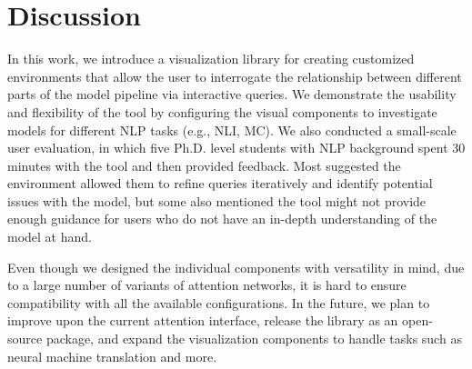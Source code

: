 \section{Discussion}
In this work, we introduce a visualization library for creating customized environments that allow the user to interrogate the relationship between different parts of the model pipeline via interactive queries.
%
We demonstrate the usability and flexibility of the tool by configuring the visual components to investigate models for different NLP tasks (e.g., NLI, MC).
%
We also conducted a small-scale user evaluation, in which five Ph.D. level students with NLP background spent 30 minutes with the tool and then provided feedback. Most suggested the environment allowed them to refine queries iteratively and identify potential issues with the model, but some also mentioned the tool might not provide enough guidance for users who do not have an in-depth understanding of the model at hand.

Even though we designed the individual components with versatility in mind, due to a large number of variants of attention networks, it is hard to ensure compatibility with all the available configurations.
%
In the future, we plan to improve upon the current attention interface, release the library as an open-source package, and expand the visualization components to handle tasks such as neural machine translation and more.

